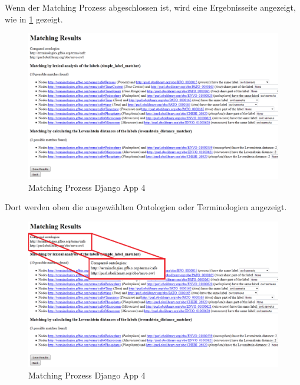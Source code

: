 		\pagebreak[4]
		Wenn der Matching Prozess abgeschlossen ist, wird eine Ergebnisseite
		angezeigt, wie in \ref{fig7} gezeigt.
		\begin{figure}[h!]
		\centering
		\includegraphics[width=1.0\textwidth]{pics/SimpleOntologyMatcher-Process3.png}
		\caption{Matching Prozess Django App 4}
		\label{fig7}
		\end{figure}
		
		\pagebreak[4]
		Dort werden oben die ausgewählten Ontologien oder Terminologien angezeigt.
		\begin{figure}[h!]
		\centering
		\includegraphics[width=1.0\textwidth]{pics/SimpleOntologyMatcher-Process4.png}
		\caption{Matching Prozess Django App 4}
		\label{fig8}
		\end{figure}
		
